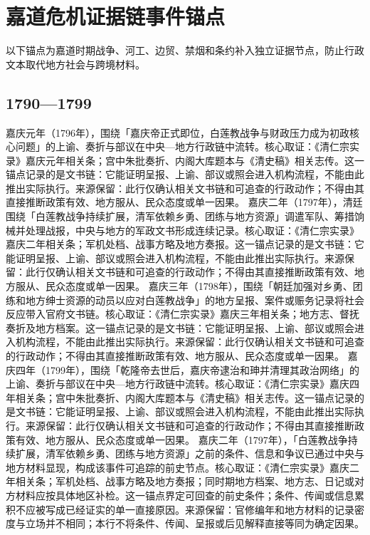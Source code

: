 \section{嘉道危机证据链事件锚点}
以下锚点为嘉道时期战争、河工、边贸、禁烟和条约补入独立证据节点，防止行政文本取代地方社会与跨境材料。
\subsection{1790—1799}
嘉庆元年（1796年），围绕「嘉庆帝正式即位，白莲教战争与财政压力成为初政核心问题」的上谕、奏折与部议在中央—地方行政链中流转。核心取证：《清仁宗实录》嘉庆元年相关条；宫中朱批奏折、内阁大库题本与《清史稿》相关志传。这一锚点记录的是文书链：它能证明呈报、上谕、部议或照会进入机构流程，不能由此推出实际执行。来源保留：此行仅确认相关文书链和可追查的行政动作；不得由其直接推断政策有效、地方服从、民众态度或单一因果。
嘉庆二年（1797年），清廷围绕「白莲教战争持续扩展，清军依赖乡勇、团练与地方资源」调遣军队、筹措饷械并处理战报，中央与地方的军政文书形成连续记录。核心取证：《清仁宗实录》嘉庆二年相关条；军机处档、战事方略及地方奏报。这一锚点记录的是文书链：它能证明呈报、上谕、部议或照会进入机构流程，不能由此推出实际执行。来源保留：此行仅确认相关文书链和可追查的行政动作；不得由其直接推断政策有效、地方服从、民众态度或单一因果。
嘉庆三年（1798年），围绕「朝廷加强对乡勇、团练和地方绅士资源的动员以应对白莲教战争」的地方呈报、案件或赈务记录将社会反应带入官府文书链。核心取证：《清仁宗实录》嘉庆三年相关条；地方志、督抚奏折及地方档案。这一锚点记录的是文书链：它能证明呈报、上谕、部议或照会进入机构流程，不能由此推出实际执行。来源保留：此行仅确认相关文书链和可追查的行政动作；不得由其直接推断政策有效、地方服从、民众态度或单一因果。
嘉庆四年（1799年），围绕「乾隆帝去世后，嘉庆帝逮治和珅并清理其政治网络」的上谕、奏折与部议在中央—地方行政链中流转。核心取证：《清仁宗实录》嘉庆四年相关条；宫中朱批奏折、内阁大库题本与《清史稿》相关志传。这一锚点记录的是文书链：它能证明呈报、上谕、部议或照会进入机构流程，不能由此推出实际执行。来源保留：此行仅确认相关文书链和可追查的行政动作；不得由其直接推断政策有效、地方服从、民众态度或单一因果。
嘉庆二年（1797年），「白莲教战争持续扩展，清军依赖乡勇、团练与地方资源」之前的条件、信息和争议已通过中央与地方材料显现，构成该事件可追踪的前史节点。核心取证：《清仁宗实录》嘉庆二年相关条；军机处档、战事方略及地方奏报；同时期地方档案、地方志、日记或对方材料应按具体地区补检。这一锚点界定可回查的前史条件；条件、传闻或信息累积不应被写成已经证实的单一直接原因。来源保留：官修编年和地方材料的记录密度与立场并不相同；本行不将条件、传闻、呈报或后见解释直接等同为确定因果。
